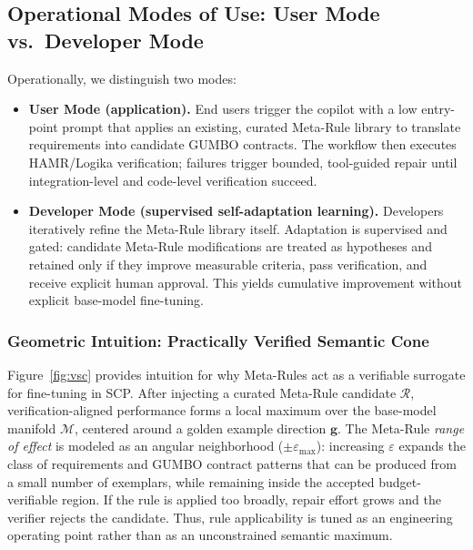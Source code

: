 \documentclass[conference]{IEEEtran}
\begin{document}

\subsection{Operational Modes of Use: User Mode vs.\ Developer Mode}
Operationally, we distinguish two modes:
\begin{itemize}
\item \textbf{User Mode (application).} End users trigger the copilot with a low entry-point prompt that applies an existing, curated Meta-Rule library to translate requirements into candidate GUMBO contracts. The workflow then executes HAMR/Logika verification; failures trigger bounded, tool-guided repair until integration-level and code-level verification succeed.
\item \textbf{Developer Mode (supervised self-adaptation learning).} Developers iteratively refine the Meta-Rule library itself. Adaptation is supervised and gated: candidate Meta-Rule modifications are treated as hypotheses and retained only if they improve measurable criteria, pass verification, and receive explicit human approval. This yields cumulative improvement without explicit base-model fine-tuning.
\end{itemize}

\subsubsection{Geometric Intuition: Practically Verified Semantic Cone}
\label{sec:vsc-intuition}

Figure~\ref{fig:vsc} provides intuition for why Meta-Rules act as a verifiable surrogate for fine-tuning in SCP. After injecting a curated Meta-Rule candidate $\mathcal{R}$, verification-aligned performance forms a local maximum over the base-model manifold $\mathcal{M}$, centered around a golden example direction $\mathbf{g}$. The Meta-Rule \emph{range of effect} is modeled as an angular neighborhood ($\pm\varepsilon_{\max}$): increasing $\varepsilon$ expands the class of requirements and GUMBO contract patterns that can be produced from a small number of exemplars, while remaining inside the accepted budget-verifiable region. If the rule is applied too broadly, repair effort grows and the verifier rejects the candidate. Thus, rule applicability is tuned as an engineering operating point rather than as an unconstrained semantic maximum.
\end{document}

